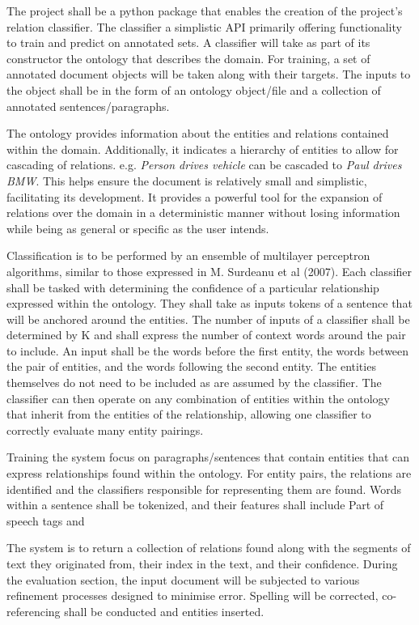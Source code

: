 \documentclass{ecmm427_assignment}
\begin{document}
\begin{description}[style=sameline,leftmargin=2cm]
\item[Structure] The project shall be a python package that enables the creation of the project's relation classifier. The classifier a simplistic API primarily offering functionality to train and predict on annotated sets. A classifier will take as part of its constructor the ontology that describes the domain. For training, a set of annotated document objects will be taken along with their targets. The inputs to the object shall be in the form of an ontology object/file and a collection of annotated sentences/paragraphs.

\item[Ontology] The ontology provides information about the entities and relations contained within the domain. Additionally, it indicates a hierarchy of entities to allow for cascading of relations. e.g. \textit{Person drives vehicle} can be cascaded to \textit{Paul drives BMW}. This helps ensure the document is relatively small and simplistic, facilitating its development. It provides a powerful tool for the expansion of relations over the domain in a deterministic manner without losing information while being as general or specific as the user intends.

\item[Technique] Classification is to be performed by an ensemble of multilayer perceptron algorithms, similar to those expressed in M. Surdeanu et al (2007). Each classifier shall be tasked with determining the confidence of a particular relationship expressed within the ontology. They shall take as inputs tokens of a sentence that will be anchored around the entities. The number of inputs of a classifier shall be determined by K and shall express the number of context words around the pair to include. An input shall be the words before the first entity, the words between the pair of entities, and the words following the second entity. The entities themselves do not need to be included as are assumed by the classifier. The classifier can then operate on any combination of entities within the ontology that inherit from the entities of the relationship, allowing one classifier to correctly evaluate many entity pairings.

\item[Training] Training the system focus on paragraphs/sentences that contain entities that can express relationships found within the ontology. For entity pairs, the relations are identified and the classifiers responsible for representing them are found. Words within a sentence shall be tokenized, and their features shall include Part of speech tags and

\item[Prediction] The system is to return a collection of relations found along with the segments of text they originated from, their index in the text, and their confidence. During the evaluation section, the input document will be subjected to various refinement processes designed to minimise error. Spelling will be corrected, co-referencing shall be conducted and entities inserted.
\end{description}
\end{document}
